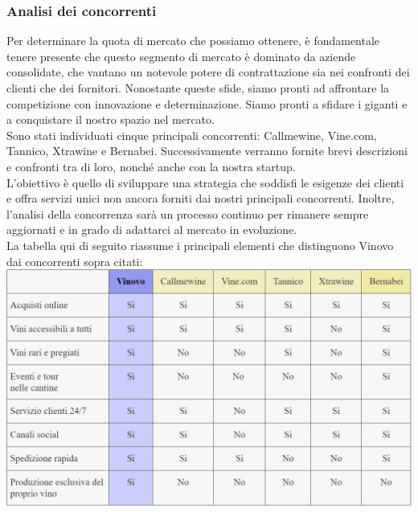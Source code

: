 \documentclass[12pt, a4paper]{article}
\newcommand{\meskip}{\medskip \\}
\begin{document}
\subsubsection{Analisi dei concorrenti}
Per determinare la quota di mercato che possiamo ottenere, è fondamentale tenere presente che questo segmento di mercato è dominato da aziende consolidate, che vantano un notevole potere di contrattazione sia nei confronti dei clienti che dei fornitori. Nonostante queste sfide, siamo pronti ad affrontare la competizione con innovazione e determinazione. Siamo pronti a sfidare i giganti e a conquistare il nostro spazio nel mercato.\meskip
Sono stati individuati cinque principali concorrenti: Callmewine, Vine.com, Tannico, Xtrawine e Bernabei. Successivamente verranno fornite brevi descrizioni e confronti tra di loro, nonché anche con la nostra startup.\meskip
L'obiettivo è quello di sviluppare una strategia che soddisfi le esigenze dei clienti e offra servizi unici non ancora forniti dai nostri principali concorrenti. Inoltre, l'analisi della concorrenza sarà un processo continuo per rimanere sempre aggiornati e in grado di adattarci al mercato in evoluzione.\meskip
La tabella qui di seguito riassume i principali elementi che distinguono Vinovo dai concorrenti sopra citati:\meskip
\includegraphics[width=\textwidth]{images/tabella_competitors.png}
\end{document}

